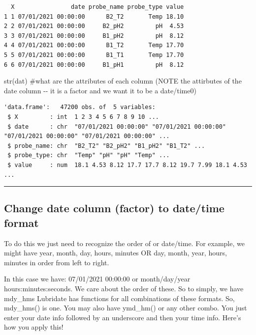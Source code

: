 \documentclass[
  letterpaper,
  DIV=11,
  numbers=noendperiod]{scrartcl}
\newenvironment{Shaded}{\begin{snugshade}}{\end{snugshade}}
\newcommand{\AlertTok}[1]{\textcolor[rgb]{0.68,0.00,0.00}{#1}}
\newcommand{\CommentTok}[1]{\textcolor[rgb]{0.37,0.37,0.37}{#1}}
\newcommand{\FunctionTok}[1]{\textcolor[rgb]{0.28,0.35,0.67}{#1}}
\newcommand{\NormalTok}[1]{\textcolor[rgb]{0.00,0.23,0.31}{#1}}
\begin{document}
\begin{verbatim}
  X                date probe_name probe_type value
1 1 07/01/2021 00:00:00      B2_T2       Temp 18.10
2 2 07/01/2021 00:00:00     B2_pH2         pH  4.53
3 3 07/01/2021 00:00:00     B1_pH2         pH  8.12
4 4 07/01/2021 00:00:00      B1_T2       Temp 17.70
5 5 07/01/2021 00:00:00      B1_T1       Temp 17.70
6 6 07/01/2021 00:00:00     B1_pH1         pH  8.12
\end{verbatim}

\begin{Shaded}
\begin{Highlighting}[]
\FunctionTok{str}\NormalTok{(dat) }\CommentTok{\#what are the attributes of each column (}\AlertTok{NOTE}\CommentTok{ the attirbutes of the date column {-}{-} it is a factor and we want it to be a date/time0)}
\end{Highlighting}
\end{Shaded}

\begin{verbatim}
'data.frame':   47200 obs. of  5 variables:
 $ X         : int  1 2 3 4 5 6 7 8 9 10 ...
 $ date      : chr  "07/01/2021 00:00:00" "07/01/2021 00:00:00" "07/01/2021 00:00:00" "07/01/2021 00:00:00" ...
 $ probe_name: chr  "B2_T2" "B2_pH2" "B1_pH2" "B1_T2" ...
 $ probe_type: chr  "Temp" "pH" "pH" "Temp" ...
 $ value     : num  18.1 4.53 8.12 17.7 17.7 8.12 19.7 7.99 18.1 4.53 ...
\end{verbatim}

\begin{center}\rule{0.5\linewidth}{0.5pt}\end{center}

\hypertarget{change-date-column-factor-to-datetime-format}{%
\subsection{\texorpdfstring{\textbf{Change date column (factor) to
date/time
format}}{Change date column (factor) to date/time format}}\label{change-date-column-factor-to-datetime-format}}

To do this we just need to recognize the order of or date/time. For
example, we might have year, month, day, hours, minutes OR day, month,
year, hours, minutes in order from left to right.

In this case we have: 07/01/2021 00:00:00 or month/day/year
hours:minutes:seconds. We care about the order of these. So to simply,
we have mdy\_hms Lubridate has functions for all combinations of these
formats. So, mdy\_hms() is one. You may also have ymd\_hm() or any other
combo. You just enter your date info followed by an underscore and then
your time info. Here's how you apply this!
\end{document}
